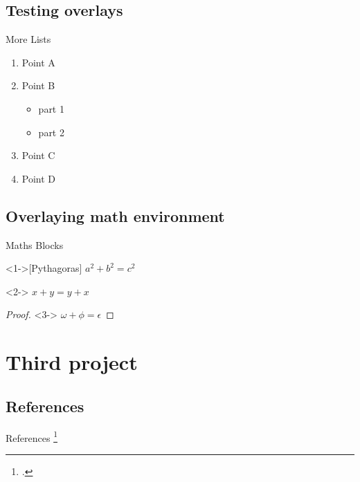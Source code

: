 \documentclass[xcolor=dvipsnames,aspectratio=\AspectRatio,\BaseFontSize]{beamer}
\numberwithin{equation}{section}        %
\begin{document}
\subsection{Testing overlays}
\begin{frame}{More Lists}
    \begin{enumerate}[I]
    \item<1-> Point A\footnotemark
    \item<2-> Point B
    \begin{itemize}
    \item<3-> part 1
    \item<4-> part 2
    \end{itemize}
    \item<5-> Point C
    \item<6-> Point D
    \end{enumerate}
    
\end{frame}
\subsection{Overlaying math environment}
\begin{frame}{Maths Blocks}
    \begin{theorem}<1->[Pythagoras] 
        $ a^2 + b^2 = c^2$
    \end{theorem}
    \begin{corollary}<2->
        $ x + y = y + x  $
    \end{corollary}
    \begin{proof}<3->
        $\omega +\phi = \epsilon $
    \end{proof}
\end{frame}
\section{Third project}
\subsection{References}
\begin{frame}{References}
    \blindtext \footcite{einstein}
\end{frame}
\end{document}
